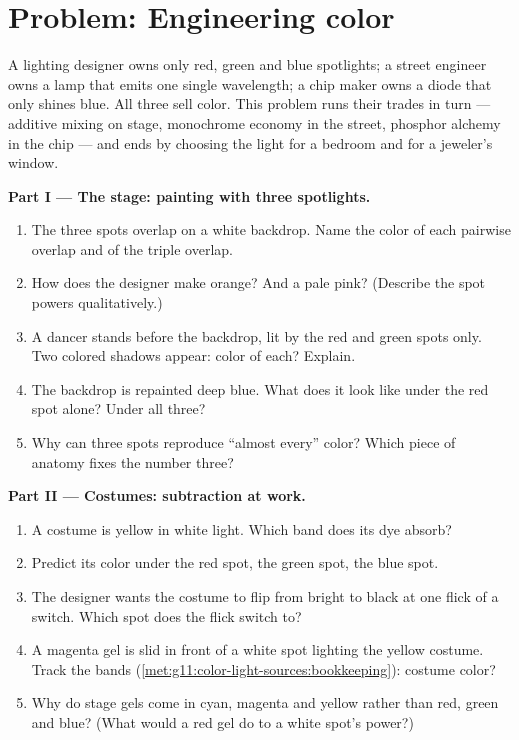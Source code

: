 \section{Problem: Engineering color}

\begin{problem}
\label{pb:g11:color-light-sources:1}
A lighting designer owns only red, green and blue spotlights; a street
engineer owns a lamp that emits one single wavelength; a chip maker owns
a diode that only shines blue. All three sell color. This problem runs
their trades in turn --- additive mixing on stage, monochrome economy in
the street, phosphor alchemy in the chip --- and ends by choosing the
light for a bedroom and for a jeweler's window.

\medskip
\noindent\textbf{Part I --- The stage: painting with three spotlights.}
\begin{enumerate}
  \item The three spots overlap on a white backdrop. Name the color of
        each pairwise overlap and of the triple overlap.
  \item How does the designer make orange? And a pale pink? (Describe
        the spot powers qualitatively.)
  \item A dancer stands before the backdrop, lit by the red and green
        spots only. Two colored shadows appear: color of each? Explain.
  \item The backdrop is repainted deep blue. What does it look like
        under the red spot alone? Under all three?
  \item Why can three spots reproduce ``almost every'' color? Which
        piece of anatomy fixes the number three?
\end{enumerate}

\medskip
\noindent\textbf{Part II --- Costumes: subtraction at work.}
\begin{enumerate}[resume]
  \item A costume is yellow in white light. Which band does its dye
        absorb?
  \item Predict its color under the red spot, the green spot, the blue
        spot.
  \item The designer wants the costume to flip from bright to black at
        one flick of a switch. Which spot does the flick switch to?
  \item A magenta gel is slid in front of a white spot lighting the
        yellow costume. Track the bands
        (\cref{met:g11:color-light-sources:bookkeeping}): costume color?
  \item Why do stage gels come in cyan, magenta and yellow rather than
        red, green and blue? (What would a red gel do to a white spot's
        power?)
\end{enumerate}


\end{problem}
